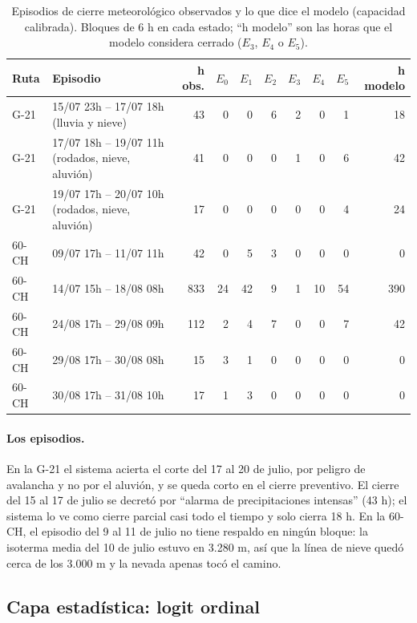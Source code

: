 \begin{table}[H]
\centering\footnotesize\setlength{\tabcolsep}{4pt}
\caption{Episodios de cierre meteorológico observados y lo que dice el modelo (capacidad calibrada). Bloques de 6 h en cada estado; ``h modelo'' son las horas que el modelo considera cerrado ($E_3$, $E_4$ o $E_5$).}
\label{tab:episodios}
\begin{tabular}{|l|l|r|r|r|r|r|r|r|r|}
\hline
Ruta & Episodio & h obs. & $E_0$ & $E_1$ & $E_2$ & $E_3$ & $E_4$ & $E_5$ & h modelo \\ \hline
G-21 & 15/07 23h -- 17/07 18h (lluvia y nieve) & 43 & 0 & 0 & 6 & 2 & 0 & 1 & 18 \\ \hline
G-21 & 17/07 18h -- 19/07 11h (rodados, nieve, aluvión) & 41 & 0 & 0 & 0 & 1 & 0 & 6 & 42 \\ \hline
G-21 & 19/07 17h -- 20/07 10h (rodados, nieve, aluvión) & 17 & 0 & 0 & 0 & 0 & 0 & 4 & 24 \\ \hline
60-CH & 09/07 17h -- 11/07 11h & 42 & 0 & 5 & 3 & 0 & 0 & 0 & 0 \\ \hline
60-CH & 14/07 15h -- 18/08 08h & 833 & 24 & 42 & 9 & 1 & 10 & 54 & 390 \\ \hline
60-CH & 24/08 17h -- 29/08 09h & 112 & 2 & 4 & 7 & 0 & 0 & 7 & 42 \\ \hline
60-CH & 29/08 17h -- 30/08 08h & 15 & 3 & 1 & 0 & 0 & 0 & 0 & 0 \\ \hline
60-CH & 30/08 17h -- 31/08 10h & 17 & 1 & 3 & 0 & 0 & 0 & 0 & 0 \\ \hline
\end{tabular}
\end{table}

\paragraph{Los episodios.} En la G-21 el sistema acierta el corte del 17 al 20 de julio, por peligro de avalancha y no por el aluvión, y se queda corto en el cierre preventivo. El cierre del 15 al 17 de julio se decretó por ``alarma de precipitaciones intensas'' (43 h); el sistema lo ve como cierre parcial casi todo el tiempo y solo cierra 18 h. En la 60-CH, el episodio del 9 al 11 de julio no tiene respaldo en ningún bloque: la isoterma media del 10 de julio estuvo en 3.280 m, así que la línea de nieve quedó cerca de los 3.000 m y la nevada apenas tocó el camino.

\subsection{Capa estadística: logit ordinal}

